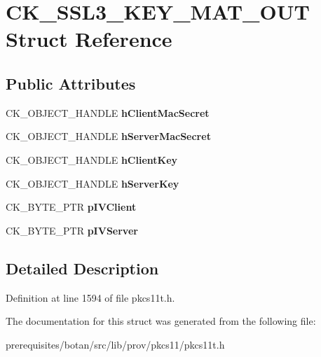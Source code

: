 \hypertarget{struct_c_k___s_s_l3___k_e_y___m_a_t___o_u_t}{}\section{C\+K\+\_\+\+S\+S\+L3\+\_\+\+K\+E\+Y\+\_\+\+M\+A\+T\+\_\+\+O\+UT Struct Reference}
\label{struct_c_k___s_s_l3___k_e_y___m_a_t___o_u_t}
\subsection*{Public Attributes}
\begin{DoxyCompactItemize}
\item 
\mbox{\label{struct_c_k___s_s_l3___k_e_y___m_a_t___o_u_t_a9ab1eebd1213b9a4e0edd87c0543b26c}} 
C\+K\+\_\+\+O\+B\+J\+E\+C\+T\+\_\+\+H\+A\+N\+D\+LE {\bfseries h\+Client\+Mac\+Secret}
\item 
\mbox{\label{struct_c_k___s_s_l3___k_e_y___m_a_t___o_u_t_a5de25eb03ea61a0a25054d5aeacd682f}} 
C\+K\+\_\+\+O\+B\+J\+E\+C\+T\+\_\+\+H\+A\+N\+D\+LE {\bfseries h\+Server\+Mac\+Secret}
\item 
\mbox{\label{struct_c_k___s_s_l3___k_e_y___m_a_t___o_u_t_aa01518b6ad293460acad4ba95886c622}} 
C\+K\+\_\+\+O\+B\+J\+E\+C\+T\+\_\+\+H\+A\+N\+D\+LE {\bfseries h\+Client\+Key}
\item 
\mbox{\label{struct_c_k___s_s_l3___k_e_y___m_a_t___o_u_t_a3a1912610629182d4fe1a27f18602f04}} 
C\+K\+\_\+\+O\+B\+J\+E\+C\+T\+\_\+\+H\+A\+N\+D\+LE {\bfseries h\+Server\+Key}
\item 
\mbox{\label{struct_c_k___s_s_l3___k_e_y___m_a_t___o_u_t_a21259dbabcc7588455addfbddc207312}} 
C\+K\+\_\+\+B\+Y\+T\+E\+\_\+\+P\+TR {\bfseries p\+I\+V\+Client}
\item 
\mbox{\label{struct_c_k___s_s_l3___k_e_y___m_a_t___o_u_t_aab8e3a04c7ababeaf39ae5692a6c4178}} 
C\+K\+\_\+\+B\+Y\+T\+E\+\_\+\+P\+TR {\bfseries p\+I\+V\+Server}
\end{DoxyCompactItemize}


\subsection{Detailed Description}


Definition at line 1594 of file pkcs11t.\+h.



The documentation for this struct was generated from the following file\+:\begin{DoxyCompactItemize}
\item 
prerequisites/botan/src/lib/prov/pkcs11/pkcs11t.\+h\end{DoxyCompactItemize}

